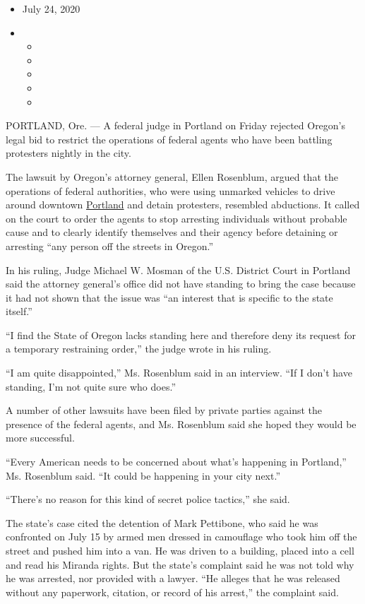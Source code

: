 \begin{itemize}
\item
  July 24, 2020
\item
  \begin{itemize}
  \item
  \item
  \item
  \item
  \item
  \end{itemize}
\end{itemize}

PORTLAND, Ore. --- A federal judge in Portland on Friday rejected
Oregon's legal bid to restrict the operations of federal agents who have
been battling protesters nightly in the city.

The lawsuit by Oregon's attorney general, Ellen Rosenblum, argued that
the operations of federal authorities, who were using unmarked vehicles
to drive around downtown
\href{https://www.nytimes.com/article/portland-protests-explained-protesters.html}{Portland}
and detain protesters, resembled abductions. It called on the court to
order the agents to stop arresting individuals without probable cause
and to clearly identify themselves and their agency before detaining or
arresting ``any person off the streets in Oregon.''

In his ruling, Judge Michael W. Mosman of the U.S. District Court in
Portland said the attorney general's office did not have standing to
bring the case because it had not shown that the issue was ``an interest
that is specific to the state itself.''

``I find the State of Oregon lacks standing here and therefore deny its
request for a temporary restraining order,'' the judge wrote in his
ruling.

``I am quite disappointed,'' Ms. Rosenblum said in an interview. ``If I
don't have standing, I'm not quite sure who does.''

A number of other lawsuits have been filed by private parties against
the presence of the federal agents, and Ms. Rosenblum said she hoped
they would be more successful.

``Every American needs to be concerned about what's happening in
Portland,'' Ms. Rosenblum said. ``It could be happening in your city
next.''

``There's no reason for this kind of secret police tactics,'' she said.

The state's case cited the detention of Mark Pettibone, who said he was
confronted on July 15 by armed men dressed in camouflage who took him
off the street and pushed him into a van. He was driven to a building,
placed into a cell and read his Miranda rights. But the state's
complaint said he was not told why he was arrested, nor provided with a
lawyer. ``He alleges that he was released without any paperwork,
citation, or record of his arrest,'' the complaint said.

